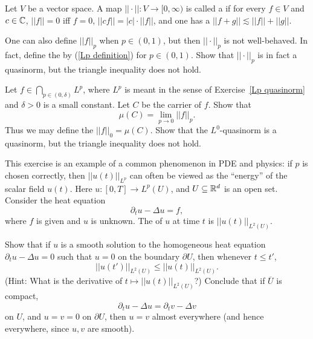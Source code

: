 \begin{definition}
Let $V$ be a vector space.
A map $||\cdot||: V \to [0, \infty)$ is called a  if for every $f \in V$ and $c \in \mathbb{C}$, $||f|| = 0$ iff $f = 0$, $||cf|| = |c|\cdot||f||$, and one has a  $||f + g|| \lesssim ||f|| + ||g||$.
\end{definition}

\begin{exercise}\label{Lp quasinorm}
One can also define $||f||_{p} $ when $p \in (0, 1)$, but then $||\cdot||_{p} $ is not well-behaved.
In fact, define the  by (\ref{Lp definition}) for $p \in (0, 1)$.
Show that $||\cdot||_{p} $ is in fact a quasinorm, but the triangle inequality does not hold.
\end{exercise}

\begin{exercise}
Let $f \in \bigcap_{p \in (0, \delta)} L^p$, where $L^p$ is meant in the sense of Exercise~\ref{Lp quasinorm} and $\delta > 0$ is a small constant.
Let $C$ be the carrier of $f$. Show that
\[\mu(C) = \lim_{p \to 0} ||f||_{p} .\]
Thus we may define the  $||f||_0 = \mu(C)$.
Show that the $L^0$-quasinorm is a quasinorm, but the triangle inequality does not hold.
\end{exercise}

\begin{exercise}
This exercise is an example of a common phenomenon in PDE and physics: if $p$ is chosen correctly, then $||u(t)||_{L^p}$ can often be viewed as the ``energy'' of the scalar field $u(t)$. Here $u: [0, T] \to L^p(U)$, and $U \subseteq \mathbb{R}^d$ is an open set.
Consider the heat equation
\[\partial_{t} u - \Delta u = f,\]
where $f$ is given and $u$ is unknown. The  of $u$ at time $t$ is $||u(t)||_{L^2(U)}$.

Show that if $u$ is a smooth solution to the homogeneous heat equation $\partial_{t} u - \Delta u = 0$ such that $u = 0$ on the boundary $\partial U$, then whenever $t \leq t'$,
\[||u(t')||_{L^2(U)} \leq ||u(t)||_{L^2(U)}.\]
(Hint: What is the derivative of $t \mapsto ||u(t)||_{L^2(U)}$?)
Conclude that if $\overline U$ is compact,
\[\partial_{t} u - \Delta u = \partial_{t} v - \Delta v\]
on $U$, and $u = v = 0$ on $\partial U$, then $u = v$ almost everywhere (and hence everywhere, since $u,v$ are smooth).
\end{exercise}


